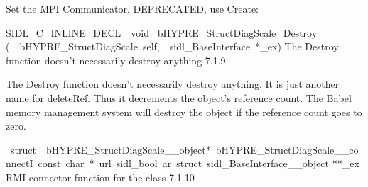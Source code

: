 \documentclass{article}
\begin{document}
\begin{cxxentry}
\begin{cxxentry}
\begin{cxxfunction}
\begin{cxxdoc}
Set the MPI Communicator.
DEPRECATED, use Create:
\end{cxxdoc}
\end{cxxfunction}
\begin{cxxfunction}
{SIDL\_C\_INLINE\_DECL\ \ void\ }
        {bHYPRE\_StructDiagScale\_Destroy}
        {(\ \ bHYPRE\_StructDiagScale\ self,\ \ sidl\_BaseInterface\ *\_ex)}
        {
The Destroy function doesn't necessarily destroy anything}
        {7.1.9}
\begin{cxxdoc}

The Destroy function doesn't necessarily destroy anything.
It is just another name for deleteRef.  Thus it decrements the
object's reference count.  The Babel memory management system will
destroy the object if the reference count goes to zero.
\end{cxxdoc}
\end{cxxfunction}
\begin{cxxvariable}
{\ struct\ \ bHYPRE\_StructDiagScale\_\_object*\ bHYPRE\_StructDiagScale\_\_connectI\ const\ char\ *\ url\ sidl\_bool\ ar\ struct\ sidl\_BaseInterface\_\_object}
        {**\_ex}
        {}
        {
RMI connector function for the class}
        {7.1.10}
\begin{cxxdoc}


\end{cxxdoc}
\end{cxxvariable}
\end{cxxentry}
\end{cxxentry}
\end{document}
